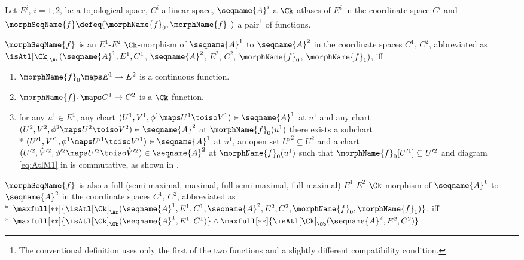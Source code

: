 \documentclass{article}
\begin{document}
\begin{definition}
\label{def:Ck-ATLmorph}
Let $E^i$, $i=1,2$, be a topological space, $C^i$ a linear space,
$\seqname{A}^i$ a $\Ck$-atlases of $E^i$ in the coordinate space $C^i$ and
$\morphSeqName{f} \defeq (\morphName{f}_0, \morphName{f}_1)$ a
pair\footnote{
  The conventional definition uses only the first of the two
  functions and a slightly different compatibility condition.
}
of functions.

$\morphSeqName{f}$ is an $E^1$-$E^2$ $\Ck$-morphism of $\seqname{A}^1$ to
$\seqname{A}^2$ in the coordinate spaces $C^1$, $C^2$, abbreviated as
$\isAtl[\Ck]_\Ar(\seqname{A}^1, E^1, C^1$,
                  $\seqname{A}^2$, $E^2$, $C^2$,
                  $\morphName{f}_0$, $\morphName{f}_1)$,
iff
\begin{enumerate}
\item $\morphName{f}_0 \maps E^1 \to E^2$ is a continuous function.
\item $\morphName{f}_1 \maps C^1 \to C^2$ is a $\Ck$ function.
\item for any $u^1 \in E^1$, any chart
$(U^1, V^1, \phi^1 \maps U^1 \toiso V^1) \in \seqname{A}^1$ at $u^1$
and any chart
$(U^2, V^2, \phi^2 \maps U^2 \toiso V^2) \in \seqname{A}^2$ at
$\morphName{f}_0(u^1)$ there exists a subchart \\*
$
  (U'^1, V'^1, \phi^1 \maps U'^1 \toiso V'^1)
  \in \seqname{A}^1
$
at $u^1$, an open set $U'^2 \subseteq U^2$ and a chart
$
  (U'^2 ,\hat{V}'^2, \phi'^2 \maps U'^2 \toiso \hat{V}'^2)
  \in \seqname{A}^2
$
at $\morphName{f}_0(u^1)$ such that
$\morphName{f}_0[U'^1] \subseteq U'^2$ and diagram \eqref{eq:AtlM1} in
 is commutative, as shown in .
\end{enumerate}

$\morphSeqName{f}$ is also a
full (semi-maximal, maximal, full semi-maximal, full maximal)
$E^1$-$E^2$ $\Ck$ morphism of $\seqname{A}^1$ to $\seqname{A}^2$ in the
coordinate spaces $C^1$, $C^2$, abbreviated as \\*
$
  \maxfull[**]
    {
      \isAtl[\Ck]_\Ar
        (
          \seqname{A}^1, E^1, C^1,
          \seqname{A}^2, E^2, C^2,
          \morphName{f}_0, \morphName{f}_1
        )
    }
$,
iff \\*
$
  \maxfull[**]
    {
      \isAtl[\Ck]_\Ob
        (
          \seqname{A}^1, E^1, C^1
        )
    }
  \land
  \maxfull[**]
    {
      \isAtl[\Ck]_\Ob
        (
          \seqname{A}^2, E^2, C^2
        )
    }
$


\end{definition}
\end{document}
